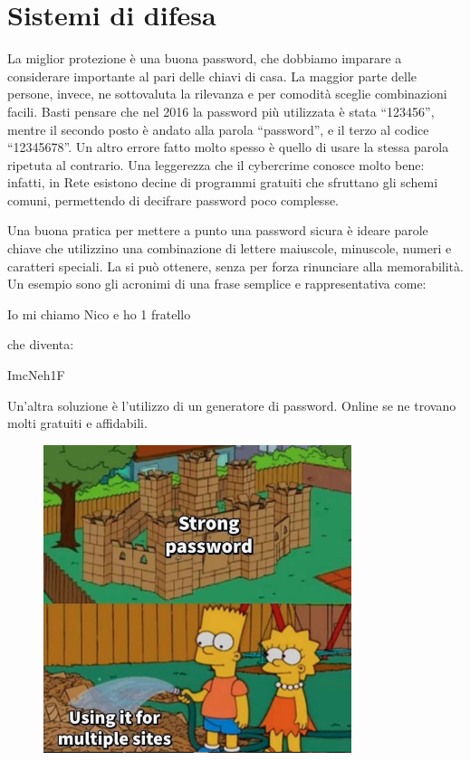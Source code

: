 \section{Sistemi di difesa}

La miglior protezione è una buona password, che dobbiamo imparare a considerare importante al pari delle chiavi di casa. La maggior parte delle persone, invece, ne sottovaluta la rilevanza e per comodità sceglie combinazioni facili. Basti pensare che nel 2016 la password più utilizzata è stata “123456”, mentre il secondo posto è andato alla parola “password”, e il terzo al codice “12345678”. Un altro errore fatto molto spesso è quello di usare la stessa parola ripetuta al contrario. Una leggerezza che il cybercrime conosce molto bene: infatti, in Rete esistono decine di programmi gratuiti che sfruttano gli schemi comuni, permettendo di decifrare password poco complesse.

Una buona pratica per mettere a punto una password sicura è ideare parole chiave che utilizzino una combinazione di lettere maiuscole, minuscole, numeri e caratteri speciali. La si può ottenere, senza per forza rinunciare alla memorabilità. Un esempio sono gli acronimi di una frase semplice e rappresentativa come:

Io mi chiamo Nico e ho 1 fratello

che diventa:

ImcNeh1F

Un’altra soluzione è l’utilizzo di un generatore di password. Online se ne trovano molti gratuiti e affidabili.

\begin{figure}[ht]
    \centering
    \includegraphics[width=90mm]{Immagini/9/simpson.png}
\end{figure}
